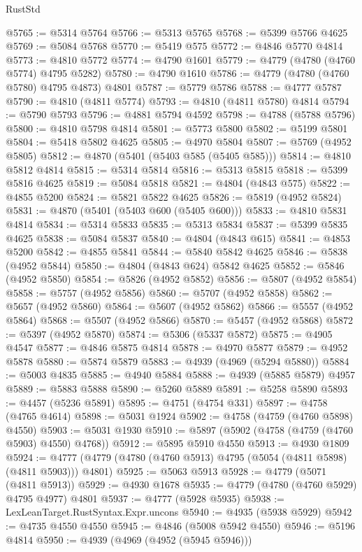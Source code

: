 \begin{lexlean}{RustStd}
\begin{coremodule}
@5765 := @5314 @5764
@5766 := @5313 @5765
@5768 := @5399 @5766 @4625
@5769 := @5084 @5768
@5770 := @5419 @575
@5772 := @4846 @5770 @4814
@5773 := @4810 @5772
@5774 := @4790 @1601
@5779 := @4779 (@4780 (@4760 @5774) @4795 @5282)
@5780 := @4790 @1610
@5786 := @4779 (@4780 (@4760 @5780) @4795 @4873) @4801
@5787 := @5779 @5786
@5788 := @4777 @5787
@5790 := @4810 (@4811 @5774)
@5793 := @4810 (@4811 @5780) @4814
@5794 := @5790 @5793
@5796 := @4881 @5794 @4592
@5798 := @4788 (@5788 @5796)
@5800 := @4810 @5798 @4814
@5801 := @5773 @5800
@5802 := @5199 @5801
@5804 := @5418 @5802 @4625
@5805 := @4970 @5804
@5807 := @5769 (@4952 @5805)
@5812 := @4870 (@5401 (@5403 @585 (@5405 @585)))
@5814 := @4810 @5812 @4814
@5815 := @5314 @5814
@5816 := @5313 @5815
@5818 := @5399 @5816 @4625
@5819 := @5084 @5818
@5821 := @4804 (@4843 @575)
@5822 := @4855 @5200
@5824 := @5821 @5822 @4625
@5826 := @5819 (@4952 @5824)
@5831 := @4870 (@5401 (@5403 @600 (@5405 @600)))
@5833 := @4810 @5831 @4814
@5834 := @5314 @5833
@5835 := @5313 @5834
@5837 := @5399 @5835 @4625
@5838 := @5084 @5837
@5840 := @4804 (@4843 @615)
@5841 := @4853 @5200
@5842 := @4855 @5841
@5844 := @5840 @5842 @4625
@5846 := @5838 (@4952 @5844)
@5850 := @4804 (@4843 @624) @5842 @4625
@5852 := @5846 (@4952 @5850)
@5854 := @5826 (@4952 @5852)
@5856 := @5807 (@4952 @5854)
@5858 := @5757 (@4952 @5856)
@5860 := @5707 (@4952 @5858)
@5862 := @5657 (@4952 @5860)
@5864 := @5607 (@4952 @5862)
@5866 := @5557 (@4952 @5864)
@5868 := @5507 (@4952 @5866)
@5870 := @5457 (@4952 @5868)
@5872 := @5397 (@4952 @5870)
@5874 := @5306 (@5337 @5872)
@5875 := @4905 @4547
@5877 := @4846 @5875 @4814
@5878 := @4970 @5877
@5879 := @4952 @5878
@5880 := @5874 @5879
@5883 := @4939 (@4969 (@5294 @5880))
@5884 := @5003 @4835
@5885 := @4940 @5884
@5888 := @4939 (@5885 @5879) @4957
@5889 := @5883 @5888
@5890 := @5260 @5889
@5891 := @5258 @5890
@5893 := @4457 (@5236 @5891)
@5895 := @4751 (@4754 @331)
@5897 := @4758 (@4765 @4614)
@5898 := @5031 @1924
@5902 := @4758 (@4759 (@4760 @5898) @4550)
@5903 := @5031 @1930
@5910 := @5897 (@5902 (@4758 (@4759 (@4760 @5903) @4550) @4768))
@5912 := @5895 @5910 @4550
@5913 := @4930 @1809
@5924 := @4777 (@4779 (@4780 (@4760 @5913) @4795 (@5054 (@4811 @5898) (@4811 @5903))) @4801)
@5925 := @5063 @5913
@5928 := @4779 (@5071 (@4811 @5913))
@5929 := @4930 @1678
@5935 := @4779 (@4780 (@4760 @5929) @4795 @4977) @4801
@5937 := @4777 (@5928 @5935)
@5938 := LexLeanTarget.RustSyntax.Expr.uncons
@5940 := @4935 (@5938 @5929)
@5942 := @4735 @4550 @4550
@5945 := @4846 (@5008 @5942 @4550)
@5946 := @5196 @4814
@5950 := @4939 (@4969 (@4952 (@5945 @5946)))

\end{coremodule}
\end{lexlean}
